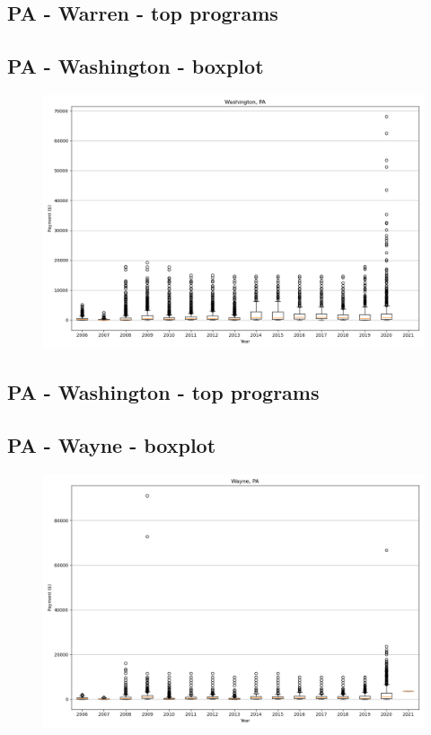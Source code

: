 \subsection*{PA - Warren - top programs}

\newpage
\subsection*{PA - Washington - boxplot}
\begin{figure}[h]
\centering
\includegraphics[width=7in]{../output/boxplots/counties/Washington-PA_boxplot.png}
\end{figure}


\subsection*{PA - Washington - top programs}

\newpage
\subsection*{PA - Wayne - boxplot}
\begin{figure}[h]
\centering
\includegraphics[width=7in]{../output/boxplots/counties/Wayne-PA_boxplot.png}
\end{figure}


